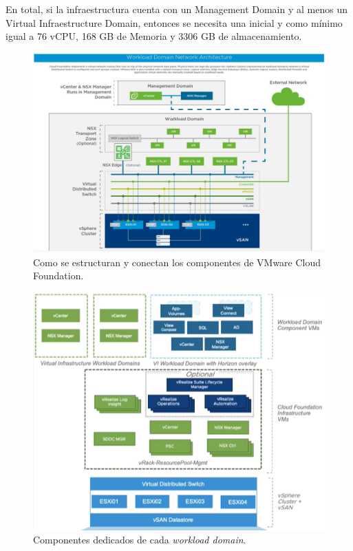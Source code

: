 En total, si la infraestructura cuenta con un Management Domain y al menos un Virtual Infraestructure Domain, entonces se necesita una  inicial y como mínimo igual a 76 vCPU, 168 GB de Memoria y 3306 GB de almacenamiento.

\begin{figure}[h!]
  \centering
  \includegraphics[width=1\textwidth]{imaxes/conceptosPrevios/WDomainStructure.JPG}
  \caption{Como se estructuran y conectan los componentes de VMware Cloud Foundation.}
  \label{fig:esquemaCFDominios}
\end{figure}
\begin{figure}[h!]
  \centering
  \includegraphics[width=1\textwidth]{imaxes/conceptosPrevios/workloadDomains.png}
  \caption{Componentes dedicados de cada \textit{workload domain}.}
  \label{fig:esquemaCFComponentes}
\end{figure}
\FloatBarrier

